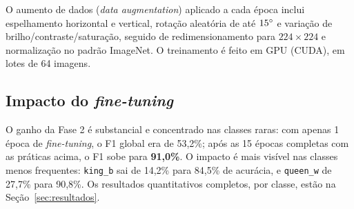 O aumento de dados (\textit{data augmentation}) aplicado a cada época inclui
espelhamento horizontal e vertical, rotação aleatória de até $15\degree$ e variação de
brilho/contraste/saturação, seguido de redimensionamento para $224\times224$ e
normalização no padrão ImageNet. O treinamento é feito em GPU (CUDA), em lotes de 64
imagens.

\subsection{Impacto do \textit{fine-tuning}}

O ganho da Fase 2 é substancial e concentrado nas classes raras: com apenas 1 época de
\textit{fine-tuning}, o F1 global era de 53,2\%; após as 15 épocas completas com as
práticas acima, o F1 sobe para \textbf{91,0\%}. O impacto é mais visível nas classes
menos frequentes: \texttt{king\_b} sai de 14,2\% para 84,5\% de acurácia, e
\texttt{queen\_w} de 27,7\% para 90,8\%. Os resultados quantitativos completos, por
classe, estão na Seção~\ref{sec:resultados}.
